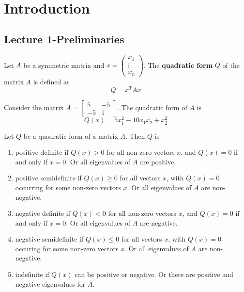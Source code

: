 
% 
\section{Introduction}
\subsection{Lecture 1-Preliminaries}
\begin{definition}
    Let $A$ be a symmetric matrix and $x = \begin{pmatrix}
        x_1 \\ \vdots \\ x_n
    \end{pmatrix}$. The \textbf{quadratic form} $Q$ of the matrix $A$ is defined as $$Q = x^T Ax$$
\end{definition}

\begin{problem}[Example]
    Consider the matrix $A = \begin{bmatrix}
        5 & -5 \\
        -5 & 1
    \end{bmatrix}$. The quadratic form of $A$ is $$Q(x) = 5x^2_1 - 10x_1x_2 + x^2_2$$
\end{problem}
\begin{definition}
    Let $Q$ be a quadratic form of a matrix $A$. Then $Q$ is
    \begin{enumerate}
        \item positive definite if $Q(x) > 0$ for all non-zero vectors $x$, and $Q(x) = 0$ if and only if $x = 0$. Or all eigenvalues of $A$ are positive.
        \item positive semidefinite if $Q(x) \geq 0$ for all vectors $x$, with $Q(x) = 0$ occurring for some non-zero vectors $x$. Or all eigenvalues of $A$ are non-negative.
        \item negative definite if $Q(x) < 0$ for all non-zero vectors $x$, and $Q(x) = 0$ if and only if $x = 0$. Or all eigenvalues of $A$ are negative.
        \item negative semidefinite if $Q(x) \leq 0$ for all vectors $x$, with $Q(x) = 0$ occuring for some non-zero vectors $x$. Or all eigenvalues of $A$ are non-negative.
        \item indefinite if $Q(x)$ can be positive or negative. Or there are positive and negative eigenvalues for $A$.
    \end{enumerate}
\end{definition}


